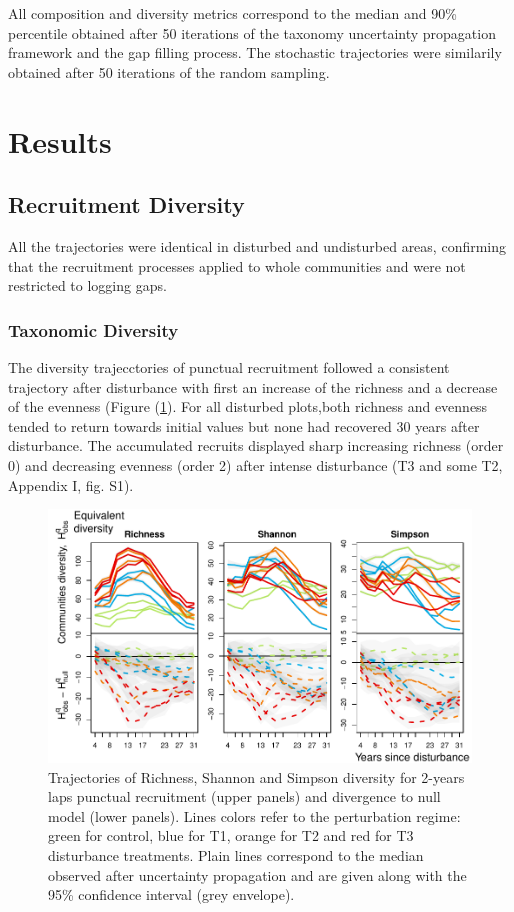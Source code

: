 \documentclass[fleqn,10pt]{ArtEcoFoG} %
\begin{document}
All composition and diversity metrics correspond to the median and 90\%
percentile obtained after 50 iterations of the taxonomy uncertainty
propagation framework and the gap filling process. The stochastic
trajectories were similarily obtained after 50 iterations of the random
sampling.

\section{Results}\label{results}

\subsection{Recruitment Diversity}\label{recruitment-diversity}

All the trajectories were identical in disturbed and undisturbed areas,
confirming that the recruitment processes applied to whole communities
and were not restricted to logging gaps.

\subsubsection{Taxonomic Diversity}\label{taxonomic-diversity}

The diversity trajecctories of punctual recruitment followed a
consistent trajectory after disturbance with first an increase of the
richness and a decrease of the evenness (Figure (\ref{fig:DivTraj}). For
all disturbed plots,both richness and evenness tended to return towards
initial values but none had recovered 30 years after disturbance. The
accumulated recruits displayed sharp increasing richness (order 0) and
decreasing evenness (order 2) after intense disturbance (T3 and some T2,
Appendix I, fig. S1).

\begin{figure}

{\centering \includegraphics[width=0.8\linewidth]{RecruitmentTrajectories_files/figure-latex/DivTraj-1} 

}

\caption{Trajectories of Richness, Shannon and Simpson diversity for 2-years laps punctual  recruitment (upper panels) and divergence to null model (lower panels). Lines colors refer to the perturbation regime: green for control, blue for T1, orange for T2 and red for T3 disturbance treatments. Plain lines correspond to the median observed after uncertainty propagation and are given along with the 95\% confidence interval (grey envelope).}\label{fig:DivTraj}
\end{figure}
\end{document}
